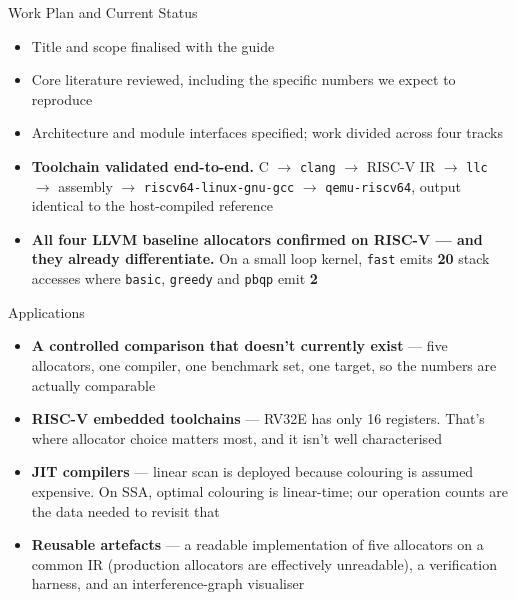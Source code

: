 \documentclass[aspectratio=169,11pt]{beamer}
\begin{document}
\begin{frame}{Work Plan and Current Status}
\begin{itemize}
  \item Title and scope finalised with the guide
  \item Core literature reviewed, including the specific numbers we expect to reproduce
  \item Architecture and module interfaces specified; work divided across four tracks
  \item \textbf{Toolchain validated end-to-end.} C $\rightarrow$ \texttt{clang}
        $\rightarrow$ RISC-V IR $\rightarrow$ \texttt{llc} $\rightarrow$ assembly
        $\rightarrow$ \texttt{riscv64-linux-gnu-gcc} $\rightarrow$
        \texttt{qemu-riscv64}, output identical to the host-compiled reference
  \item \textbf{All four LLVM baseline allocators confirmed on RISC-V --- and they
        already differentiate.} On a small loop kernel, \texttt{fast} emits
        \textbf{20} stack accesses where \texttt{basic}, \texttt{greedy} and
        \texttt{pbqp} emit \textbf{2}
\end{itemize}
\end{frame}

\begin{frame}{Applications}
\vspace{2mm}
\begin{itemize}\small
  \item \textbf{A controlled comparison that doesn't currently exist} --- five
        allocators, one compiler, one benchmark set, one target, so the numbers
        are actually comparable
  \item \textbf{RISC-V embedded toolchains} --- RV32E has only 16 registers.
        That's where allocator choice matters most, and it isn't well
        characterised
  \item \textbf{JIT compilers} --- linear scan is deployed because colouring is
        assumed expensive. On SSA, optimal colouring is linear-time; our
        operation counts are the data needed to revisit that
  \item \textbf{Reusable artefacts} --- a readable implementation of five
        allocators on a common IR (production allocators are effectively
        unreadable), a verification harness, and an interference-graph
        visualiser
\end{itemize}
\end{frame}
\end{document}
